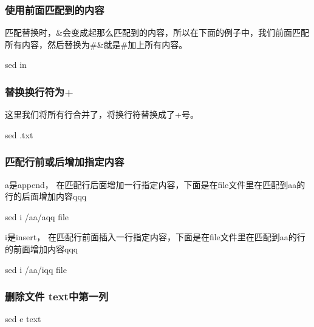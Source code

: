 \documentclass[letterpaper,10pt,english]{sphinxmanual}
\begin{document}
\subsubsection{使用前面匹配到的内容}
\label{\detokenize{scripts/shell/sed:id2}}
匹配替换时，\&会变成起那么匹配到的内容，所以在下面的例子中，我们前面匹配所有内容，然后替换为\#\&就是\#加上所有内容。

%
\begin{sphinxVerbatim}[commandchars=\\\{\}]
sed \PYGZhy{}in  
\end{sphinxVerbatim}


\subsubsection{替换换行符为+}
\label{\detokenize{scripts/shell/sed:id3}}
这里我们将所有行合并了，将换行符替换成了+号。

%
\begin{sphinxVerbatim}[commandchars=\\\{\}]
sed  .txt
\end{sphinxVerbatim}


\subsubsection{匹配行前或后增加指定内容}
\label{\detokenize{scripts/shell/sed:id4}}
a是append， 在匹配行后面增加一行指定内容，下面是在file文件里在匹配到aa的行的后面增加内容qqq

%
\begin{sphinxVerbatim}[commandchars=\\\{\}]
sed \PYGZhy{}i /aa/aqq file
\end{sphinxVerbatim}

i是insert， 在匹配行前面插入一行指定内容，下面是在file文件里在匹配到aa的行的前面增加内容qqq

%
\begin{sphinxVerbatim}[commandchars=\\\{\}]
sed \PYGZhy{}i /aa/iqq file
\end{sphinxVerbatim}


\subsubsection{删除文件 text中第一列}
\label{\detokenize{scripts/shell/sed:text}}
%
\begin{sphinxVerbatim}[commandchars=\\\{\}]
sed \PYGZhy{}e  text
\end{sphinxVerbatim}
\end{document}
